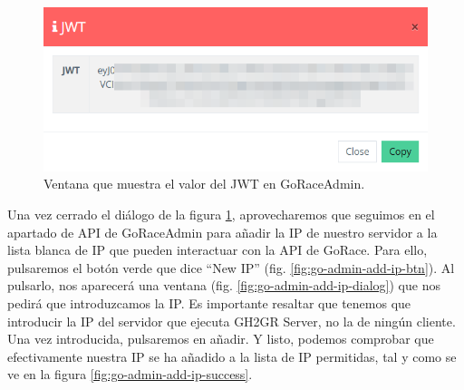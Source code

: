 \begin{figure}
    \centering
    \includegraphics[width=0.5\linewidth]{images/go-admin-add-jwt-value.png}
    \caption{Ventana que muestra el valor del JWT en GoRaceAdmin.}
    \label{fig:go-admin-add-jwt-value}
\end{figure}

Una vez cerrado el diálogo de la figura \ref{fig:go-admin-add-jwt-value}, aprovecharemos que seguimos en el apartado de \acrshort{API} de GoRaceAdmin para añadir la \acrshort{IP} de nuestro servidor a la lista blanca de \acrshort{IP} que pueden interactuar con la \acrshort{API} de GoRace. Para ello, pulsaremos el botón verde que dice ``New IP'' (fig. \ref{fig:go-admin-add-ip-btn}). Al pulsarlo, nos aparecerá una ventana (fig. \ref{fig:go-admin-add-ip-dialog}) que nos pedirá que introduzcamos la \acrshort{IP}. Es importante resaltar que tenemos que introducir la \acrshort{IP} del servidor que ejecuta GH2GR Server, no la de ningún cliente. Una vez introducida, pulsaremos en añadir. Y listo, podemos comprobar que efectivamente nuestra \acrshort{IP} se ha añadido a la lista de \acrshort{IP} permitidas, tal y como se ve en la figura \ref{fig:go-admin-add-ip-success}.

